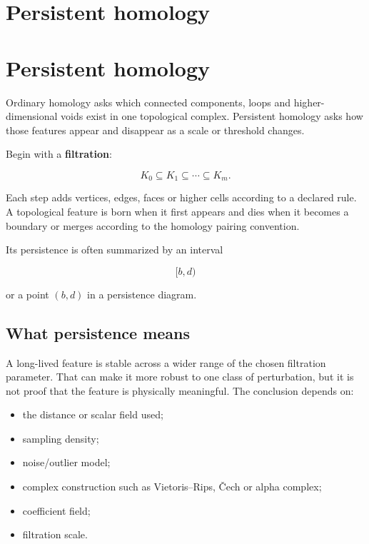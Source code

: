 \hypertarget{appendix-e4d8ed8d6787}{}
\section*{Persistent homology}
\section{Persistent homology}\label{appendix-e4d8ed8d6787-persistent-homology}

Ordinary homology asks which connected components, loops and higher-dimensional voids exist in one topological complex. Persistent homology asks how those features appear and disappear as a scale or threshold changes.

Begin with a \textbf{filtration}:

\[
K_0\subseteq K_1\subseteq\cdots\subseteq K_m.
\]

Each step adds vertices, edges, faces or higher cells according to a declared rule. A topological feature is born when it first appears and dies when it becomes a boundary or merges according to the homology pairing convention.

Its persistence is often summarized by an interval

\[
[b,d)
\]

or a point \((b,d)\) in a persistence diagram.

\subsection{What persistence means}\label{appendix-e4d8ed8d6787-what-persistence-means}

A long-lived feature is stable across a wider range of the chosen filtration parameter. That can make it more robust to one class of perturbation, but it is not proof that the feature is physically meaningful. The conclusion depends on:

\begin{itemize}
\tightlist
\item
  the distance or scalar field used;
\item
  sampling density;
\item
  noise/outlier model;
\item
  complex construction such as Vietoris--Rips, Čech or alpha complex;
\item
  coefficient field;
\item
  filtration scale.
\end{itemize}

